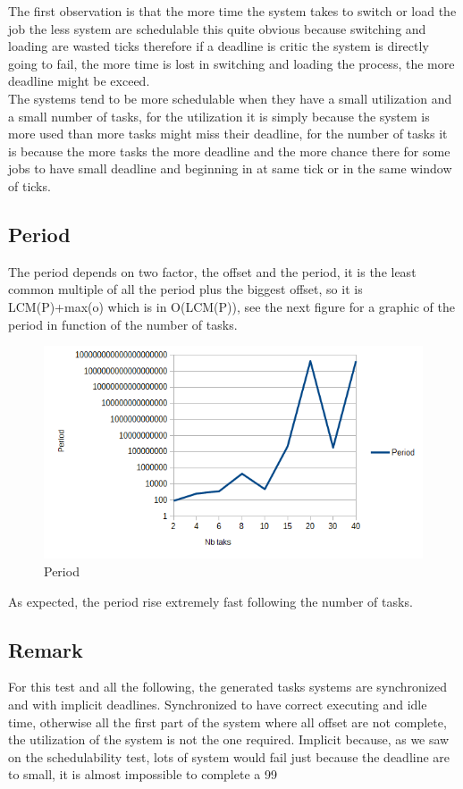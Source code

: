 \documentclass[a4paper,12pt]{article}
\begin{document}
The first observation is that the more time the system takes to switch or load the job the less system are schedulable this quite obvious because switching and loading are wasted ticks therefore if a deadline is critic the system is directly going to fail, the more time is lost in switching and loading the process, the more deadline might be exceed.\\
The systems tend to be more schedulable when they have a small utilization and a small number of tasks, for the utilization it is simply because the system is more used than more tasks might miss their deadline, for the number of tasks it is because the more tasks the more deadline and the more chance there for some jobs to have small deadline and beginning in at same tick or in the same window of ticks.\\

\subsection{Period}
The period depends on two factor, the offset and the period, it is the least common multiple of all the period plus the biggest offset, so it is LCM(P)+max(o) which is in O(LCM(P)), see the next figure for a graphic of the period in function of the number of tasks.\\

\begin{figure}[H]
	\begin{center}
		\includegraphics{periodtasks.png}
	\end{center}
	\label{period}
	\caption{Period}
\end{figure}
As expected, the period rise extremely fast following the number of tasks.

\subsection{Remark}
For this test and all the following, the generated tasks systems are synchronized and with implicit deadlines. Synchronized to have correct executing and idle time, otherwise all the first part of the system where all offset are not complete, the utilization of the system is not the one required. Implicit because, as we saw on the schedulability test, lots of system would fail just because the deadline are to small, it is almost impossible to complete a 99%
\end{document}
